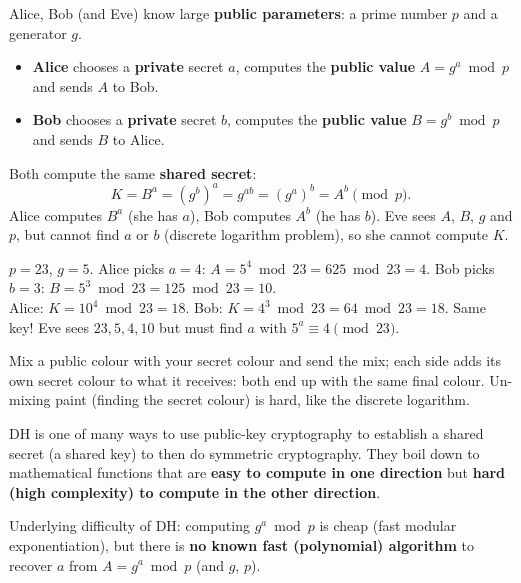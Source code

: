 \begin{defnbox}[title=Diffie-Hellman (DH) key exchange]
Alice, Bob (and Eve) know large \textbf{public parameters}: a prime number $p$ and a
generator $g$.
\begin{itemize}
  \item \textbf{Alice} chooses a \textbf{private} secret $a$, computes the
        \textbf{public value} $A = g^a \bmod p$ and sends $A$ to Bob.
  \item \textbf{Bob} chooses a \textbf{private} secret $b$, computes the
        \textbf{public value} $B = g^b \bmod p$ and sends $B$ to Alice.
\end{itemize}
Both compute the same \textbf{shared secret}:
\[
  K = B^a = (g^b)^a = g^{ab} = (g^a)^b = A^b \pmod p .
\]
Alice computes $B^a$ (she has $a$), Bob computes $A^b$ (he has $b$). Eve sees $A$, $B$,
$g$ and $p$, but cannot find $a$ or $b$ (discrete logarithm problem), so she cannot
compute $K$.
\end{defnbox}

\begin{exbox}[title={Toy example (real $p$ has 2048+ bits)}]
$p = 23$, $g = 5$. Alice picks $a = 4$: $A = 5^4 \bmod 23 = 625 \bmod 23 = 4$. Bob picks
$b = 3$: $B = 5^3 \bmod 23 = 125 \bmod 23 = 10$. \\
Alice: $K = 10^4 \bmod 23 = 18$. Bob: $K = 4^3 \bmod 23 = 64 \bmod 23 = 18$. Same key!
Eve sees $23, 5, 4, 10$ but must find $a$ with $5^a \equiv 4 \pmod{23}$.
\end{exbox}

\begin{rembox}[title=Paint analogy]
Mix a public colour with your secret colour and send the mix; each side adds its own
secret colour to what it receives: both end up with the same final colour. Un-mixing
paint (finding the secret colour) is hard, like the discrete logarithm.
\end{rembox}

\begin{defnbox}[title=Trapdoor functions]
DH is one of many ways to use public-key cryptography to establish a shared secret (a
shared key) to then do symmetric cryptography. They boil down to mathematical functions
that are \textbf{easy to compute in one direction} but \textbf{hard (high complexity) to
compute in the other direction}.
\end{defnbox}

\begin{defnbox}[title=Discrete Logarithm Problem (DLP)]
Underlying difficulty of DH: computing $g^a \bmod p$ is cheap (fast modular
exponentiation), but there is \textbf{no known fast (polynomial) algorithm} to recover
$a$ from $A = g^a \bmod p$ (and $g$, $p$).
\end{defnbox}

